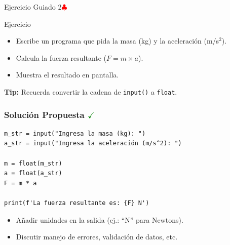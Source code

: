 \documentclass[10pt]{beamer}
\begin{document}
\begin{frame}{Ejercicio Guiado 2\hfill \textcolor{red}{$\clubsuit$}}
\begin{block}{Ejercicio}
  \begin{itemize}
    \item Escribe un programa que pida la masa (kg) y la aceleración (m/s\(^2\)).
    \item Calcula la fuerza resultante (\(F = m \times a\)).
    \item Muestra el resultado en pantalla.
  \end{itemize}
\end{block}
\textbf{Tip:} Recuerda convertir la cadena de \texttt{input()} a \texttt{float}.
\end{frame}


\begin{frame}[fragile]
\frametitle{Solución Propuesta \hfill \textcolor{green}{$\checkmark$}}
\begin{verbatim}
m_str = input("Ingresa la masa (kg): ")
a_str = input("Ingresa la aceleración (m/s^2): ")

m = float(m_str)
a = float(a_str)
F = m * a

print(f'La fuerza resultante es: {F} N')
\end{verbatim}
\begin{itemize}
  \item Añadir unidades en la salida (ej.: “N” para Newtons).
  \item Discutir manejo de errores, validación de datos, etc.
\end{itemize}
\end{frame}
\end{document}
